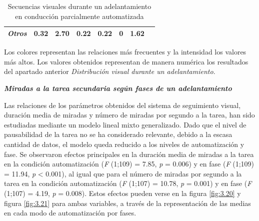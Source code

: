 \begin{table}[h]
\begin{tabular}{|llllllll|}
\multicolumn{1}{|l|}{\textit{Otros}}                                                          & \multicolumn{1}{l|}{\cellcolor[HTML]{FBFBFF}0.32}                                        & \multicolumn{1}{l|}{\cellcolor[HTML]{ECF3FB}2.70}  & \multicolumn{1}{l|}{\cellcolor[HTML]{FBFCFF}0.22}                                        & \multicolumn{1}{l|}{\cellcolor[HTML]{FBFCFF}0.22}                                         & \multicolumn{1}{l|}{\cellcolor[HTML]{FCFCFF}0}                                          & \multicolumn{1}{l|}{\cellcolor[HTML]{F3F7FD}1.62}  & \cellcolor[HTML]{C9C9C9}            \\ \hline
\end{tabular}
\caption{Secuencias visuales durante un adelantamiento en conducción parcialmente automatizada}
\label{tab:3.15}
\end{table}

Los colores representan las relaciones más frecuentes y la intensidad los valores más altos. Los valores obtenidos representan de manera numérica los resultados del apartado anterior \emph{Distribución visual durante un adelantamiento}. 

\textbf{\emph{Miradas a la tarea secundaria según fases de un adelantamiento}}\label{3233}

Las relaciones de los parámetros obtenidos del sistema de seguimiento visual, duración media de miradas y número de miradas por segundo a la tarea, han sido estudiadas mediante un modelo lineal mixto generalizado. Dado que el nivel de pausabilidad de la tarea no se ha considerado relevante, debido a la escasa cantidad de datos, el modelo queda reducido a los niveles de automatización y fase. Se observaron efectos principales en la duración media de miradas a la tarea en la condición automatización (\emph{F} (1;109) = 7.85, \emph{p} = 0.006) y en fase (\emph{F} (1;109) = 11.94, \emph{p} < 0.001), al igual que para el número de miradas por segundo a la tarea en la condición automatización (\emph{F} (1;107) = 10.78, \emph{p} = 0.001) y en fase (\emph{F} (1;107) = 4.19, \emph{p} = 0.008).
Estos efectos pueden verse en la figura \ref{fig:3.20} y figura \ref{fig:3.21} para ambas variables, a través de la representación de las medias en cada modo de automatización por fases.  

